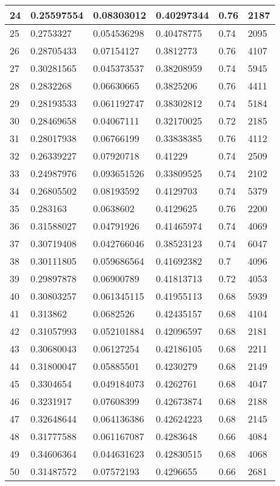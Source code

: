\begin{longtable}{|l|l|l|l|l|l|}
24 & 0.25597554 & 0.08303012 & 0.40297344 & 0.76 & 2187 \\ \hline 
25 & 0.2753327 & 0.054536298 & 0.40478775 & 0.74 & 2095 \\ \hline 
26 & 0.28705433 & 0.07154127 & 0.3812773 & 0.76 & 4107 \\ \hline 
27 & 0.30281565 & 0.045373537 & 0.38208959 & 0.74 & 5945 \\ \hline 
28 & 0.2832268 & 0.06630665 & 0.3825206 & 0.76 & 4411 \\ \hline 
29 & 0.28193533 & 0.061192747 & 0.38302812 & 0.74 & 5184 \\ \hline 
30 & 0.28469658 & 0.04067111 & 0.32170025 & 0.72 & 2185 \\ \hline 
31 & 0.28017938 & 0.06766199 & 0.33838385 & 0.76 & 4112 \\ \hline 
32 & 0.26339227 & 0.07920718 & 0.41229 & 0.74 & 2509 \\ \hline 
33 & 0.24987976 & 0.093651526 & 0.33809525 & 0.74 & 2102 \\ \hline 
34 & 0.26805502 & 0.08193592 & 0.4129703 & 0.74 & 5379 \\ \hline 
35 & 0.283163 & 0.0638602 & 0.4129625 & 0.76 & 2200 \\ \hline 
36 & 0.31588027 & 0.04791926 & 0.41465974 & 0.74 & 4069 \\ \hline 
37 & 0.30719408 & 0.042766046 & 0.38523123 & 0.74 & 6047 \\ \hline 
38 & 0.30111805 & 0.059686564 & 0.41692382 & 0.7 & 4096 \\ \hline 
39 & 0.29897878 & 0.06900789 & 0.41813713 & 0.72 & 4053 \\ \hline 
40 & 0.30803257 & 0.061345115 & 0.41955113 & 0.68 & 5939 \\ \hline 
41 & 0.313862 & 0.0682526 & 0.42435157 & 0.68 & 4104 \\ \hline 
42 & 0.31057993 & 0.052101884 & 0.42096597 & 0.68 & 2181 \\ \hline 
43 & 0.30680043 & 0.06127254 & 0.42186105 & 0.68 & 2211 \\ \hline 
44 & 0.31800047 & 0.05885501 & 0.4230279 & 0.68 & 2149 \\ \hline 
45 & 0.3304654 & 0.049184073 & 0.4262761 & 0.68 & 4047 \\ \hline 
46 & 0.3231917 & 0.07608399 & 0.42673874 & 0.68 & 2188 \\ \hline 
47 & 0.32648644 & 0.064136386 & 0.42624223 & 0.68 & 2145 \\ \hline 
48 & 0.31777588 & 0.061167087 & 0.4283648 & 0.66 & 4084 \\ \hline 
49 & 0.34606364 & 0.044631623 & 0.42830515 & 0.68 & 4068 \\ \hline 
50 & 0.31487572 & 0.07572193 & 0.4296655 & 0.66 & 2681 \\ \hline 
\end{longtable}